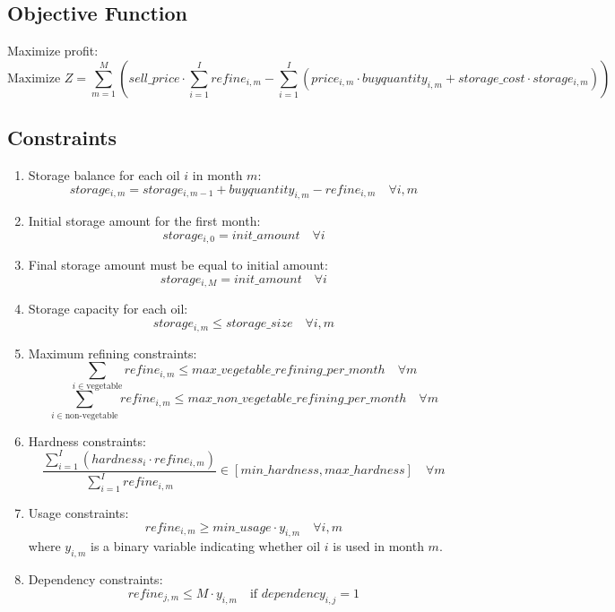 \documentclass{article}
\begin{document}
\subsection*{Objective Function}
Maximize profit:
\[
\text{Maximize } Z = \sum_{m=1}^{M} \left( sell\_price \cdot \sum_{i=1}^{I} refine_{i,m} - \sum_{i=1}^{I} \left( price_{i,m} \cdot buyquantity_{i,m} + storage\_cost \cdot storage_{i,m} \right) \right)
\]

\subsection*{Constraints}
\begin{enumerate}
    \item Storage balance for each oil $i$ in month $m$:
    \[
    storage_{i,m} = storage_{i,m-1} + buyquantity_{i,m} - refine_{i,m} \quad \forall i, m
    \]
    \item Initial storage amount for the first month:
    \[
    storage_{i,0} = init\_amount \quad \forall i
    \]
    \item Final storage amount must be equal to initial amount:
    \[
    storage_{i,M} = init\_amount \quad \forall i
    \]
    \item Storage capacity for each oil:
    \[
    storage_{i,m} \leq storage\_size \quad \forall i, m
    \]
    \item Maximum refining constraints:
    \[
    \sum_{i \in \text{vegetable}} refine_{i,m} \leq max\_vegetable\_refining\_per\_month \quad \forall m
    \]
    \[
    \sum_{i \in \text{non-vegetable}} refine_{i,m} \leq max\_non\_vegetable\_refining\_per\_month \quad \forall m
    \]
    \item Hardness constraints:
    \[
    \frac{\sum_{i=1}^{I} (hardness_{i} \cdot refine_{i,m})}{\sum_{i=1}^{I} refine_{i,m}} \in [min\_hardness, max\_hardness] \quad \forall m
    \]
    \item Usage constraints:
    \[
    refine_{i,m} \geq min\_usage \cdot y_{i,m} \quad \forall i, m
    \]
    where $y_{i,m}$ is a binary variable indicating whether oil $i$ is used in month $m$.
    \item Dependency constraints:
    \[
    refine_{j,m} \leq M \cdot y_{i,m} \quad \text{if } dependency_{i,j} = 1
    \]
\end{enumerate}
\end{document}
